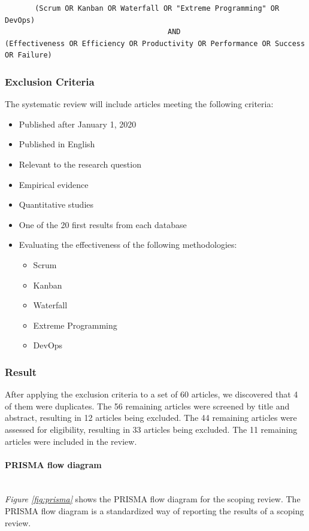 \documentclass[12pt]{article}
\newcommand{\subsubsubsection}[1]{\paragraph{#1}\mbox{}\\}
\begin{document}
\begin{adjustwidth}{-4em}{0pt}
\begin{verbatim}
       (Scrum OR Kanban OR Waterfall OR "Extreme Programming" OR DevOps) 
                                      AND
(Effectiveness OR Efficiency OR Productivity OR Performance OR Success OR Failure)
\end{verbatim}
\end{adjustwidth}

\subsubsection{Exclusion Criteria}
The systematic review will include articles meeting the following criteria:
\begin{itemize}
  \item Published after January 1, 2020
  \item Published in English
  \item Relevant to the research question
  \item Empirical evidence
  \item Quantitative studies
  \item One of the 20 first results from each database
  \item Evaluating the effectiveness of the following methodologies:
  \begin{itemize}
    \item Scrum
    \item Kanban
    \item Waterfall
    \item Extreme Programming
    \item DevOps
  \end{itemize}
\end{itemize}

\subsubsection{Result}
After applying the exclusion criteria to a set of 60 articles, we discovered that 4 of them were duplicates.
The 56 remaining articles were screened by title and abstract, resulting in 12 articles being excluded.
The 44 remaining articles were assessed for eligibility, resulting in 33 articles being excluded.
The 11 remaining articles were included in the review.

\subsubsubsection{PRISMA flow diagram}
\textit{Figure \ref{fig:prisma}} shows the PRISMA \cite{PRISMAStatement} flow diagram for the scoping review.
The PRISMA flow diagram is a standardized way of reporting the results of a scoping review.
\end{document}
